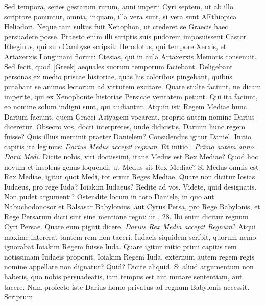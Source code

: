 Sed tempora,
series gestarum rurum, anni imperii Cyri septem, ut ab illo
scriptore ponuntur, omnia, inquam, illa vera sunt, si vera sunt AEthiopica
Heliodori.
Neque tam sultus fuit Xenophon, ut crederet se
Graecis haec persuadere posse.
Praesto enim illi scriptis suis pudorem
imposuissent Castor Rheginus, qui sub Cambyse scripsit: Herodotus,
qui tempore Xerxis, et Artaxerxis Longimani floruit: Ctesias, qui in
aula Artaxerxis Memoris consenuit.
Sed fecit, quod \textgreek{[Greek]} aequales
suorum temporum faciebant.
Deligebant personas ex medio priscae
historiae, quas his coloribus pingebant, quibus putabant se animos
lectorum ad virtutem excitare.
Quare stulte faciunt, ne dicam
imperite, qui ex Xenophonte historiae Persicae veritatem petunt.
Qui ita faciunt, eo nomine solum indigni sunt, qui audiantur.
Atquin isti Regem Mediae hunc Darium faciunt, quem Graeci Astyagem
vocarent, proprio autem nomine Darius diceretur.
Obsecro
vos, docti interpretes, unde didicistis, Darium hunc regem fuisse?
Quis illius meminit praeter Danielem?
Consulendus igitur Daniel.
Initio  capitis ita legimus:
 \textit{Darius Medus accepit regnum}.
Et initio : \textit{Primo autem anno Darii Medi}.
Dicite nobis, viri doctissimi, itane
Medus est Rex Mediae?
Quod hoc novum et insolens genus loquendi,
ut Medus sit Rex Mediae?
Si Medus omnis est Rex Mediae,
igitur quot Medi, tot erunt Reges Mediae.
Quare non dicitur Iosias
Iudaeus, pro rege Iuda?
Ioiakim Iudaeus?
Redite ad vos.
Videte, quid
designatis.
Non pudet argumenti?
Ostendite locum in toto Daniele,
in quo aut Nabuchodonosor et Balsasar Babylonius, aut Cyrus
Persa, pro Rege Babylonis, et Rege Persarum dicti sint sine mentione
regni: ut , 28.
Ibi enim dicitur regnum Cyri Persae.
Quare eum piguit dicere, \textit{Darius Rex Media accepit Regnum}?
Atqui maxime intererat
tantem rem non taceri.
Iudaeis siquidem scribit, quorum nemo
ignorabat Ioiakim Regem fuisse Iuda.
Quare igitur initio primi
capitis rem notissimam Iudaeis proponit, Ioiakim Regem Iuda, externum
autem regem regis nomine appellare non dignatur?
Quid?
Dicite aliquid.
Si aliud argumentum non habetis, quo nobis persuadeatis,
iam tempus est aut mutare sententiam, aut tacere.
Nam profecto iste Darius homo privatus ad regnum Babylonis accessit.
Scriptum

